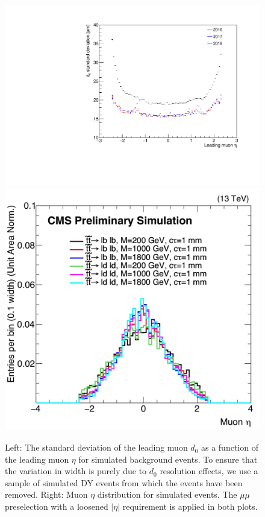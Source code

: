 \begin{figure}[hbtp]
\centering
\includegraphics[scale=0.3]{figures/large_eta/d0_stdDev_vs_eta_compareYears.pdf}
\includegraphics[scale=0.12]{figures/large_eta/muonEta.pdf}
\caption{Left: The standard deviation of the leading muon $d_0$ as a function of the leading muon $\eta$ for simulated background events. To ensure that the variation in width is purely due to $d_0$ resolution effects, we use a sample of simulated DY events from which the \ztautaull events have been removed. Right: Muon $\eta$ distribution for simulated \stoptolb events. The ${\mu}{\mu}$ preselection with a loosened $|\eta|$ requirement is applied in both plots.}
\label{large_eta_mu}
\end{figure}